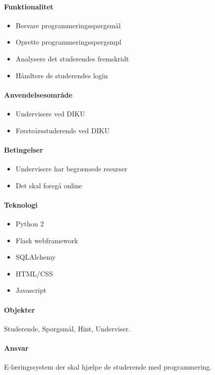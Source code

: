 \documentclass[11pt, a4paper]{article}
\begin{document}
\paragraph{Funktionalitet}
\begin{itemize}
    \item Besvare programmeringsspørgsmål
    \item Oprette programmeringsspørgsmpl
    \item Analysere det studerendes fremskridt
    \item Håndtere de studerendes login
\end{itemize}
\paragraph{Anvendelsesområde}
\begin{itemize}
    \item Undervisere ved DIKU
    \item Førsteårsstuderende ved DIKU
\end{itemize}
\paragraph{Betingelser}
\begin{itemize}
    \item Undervisere har begrænsede resurser
    \item Det skal foregå online
\end{itemize}
\paragraph{Teknologi}
\begin{itemize}
    \item Python 2
    \item Flask webframework
    \item SQLAlchemy
    \item HTML/CSS
    \item Javascript
\end{itemize}
\paragraph{Objekter}
Studerende, Spørgsmål, Hint, Underviser.
\paragraph{Ansvar}
E-læringssystem der skal hjælpe de studerende med programmering.
\end{document}

